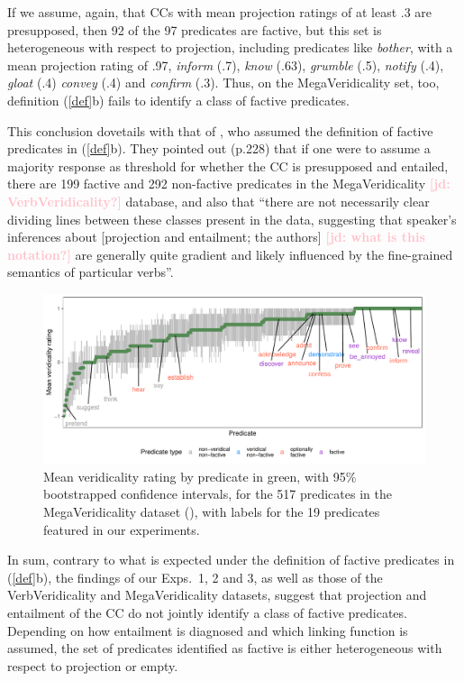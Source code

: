\documentclass[11pt,fleqn]{article}
\newcommand{\jd}[1]{\textbf{\textcolor{Pink}{[jd: #1]}}}
\newcommand{\6}{\mbox{$[\hspace*{-.6mm}[$}}
\newcommand{\9}{\mbox{$]\hspace*{-.6mm}]$}}
\begin{document}
If we assume, again, that CCs with mean projection ratings of at least .3 are presupposed, then 92 of the 97 predicates are factive,
 but this set is heterogeneous with respect to projection, including predicates like {\em bother}, with a mean projection rating of .97, {\em inform} (.7), {\em know} (.63), {\em grumble} (.5), {\em notify} (.4), {\em gloat} (.4) {\em convey} (.4) and {\em confirm} (.3). Thus, on the MegaVeridicality set, too, definition (\ref{def}b) fails to identify a class of factive predicates. 
 
 This conclusion dovetails with that of \citet{white-rawlins-nels2018}, who assumed the definition of factive predicates in (\ref{def}b). They pointed out (p.228) that if one were to assume a majority response as threshold for whether the CC is presupposed and entailed, there are 199 factive and 292 non-factive predicates in the MegaVeridicality \jd{VerbVeridicality?} database, and also that ``there are not necessarily clear dividing lines between these classes present in the data, suggesting that speaker's inferences about [projection and entailment; the authors] \jd{what is this notation?} are generally quite gradient and likely influenced by the fine-grained semantics
of particular verbs''.

\begin{figure}[H]
\centering
\includegraphics[width=.75\paperwidth]{../../MegaVeridicality-analysis/graphs/means-entailment-by-predicate}

\caption{Mean veridicality rating by predicate in green, with 95\% bootstrapped confidence intervals, for the 517 predicates in the MegaVeridicality dataset (\citealt{white-rawlins-nels2018,white-etal2018b}), with labels for the 19 predicates featured in our experiments.}
\label{f-white-rawlins-ent}
\end{figure}

In sum, contrary to what is expected under the definition of factive predicates in (\ref{def}b), the findings of our Exps.~1, 2 and 3, as well as those of the VerbVeridicality and MegaVeridicality datasets, suggest that projection and entailment of the CC do not jointly identify a class of factive predicates. Depending on how entailment is diagnosed and which linking function is assumed, the set of predicates identified as factive is either heterogeneous with respect to projection or empty. 
\end{document}

